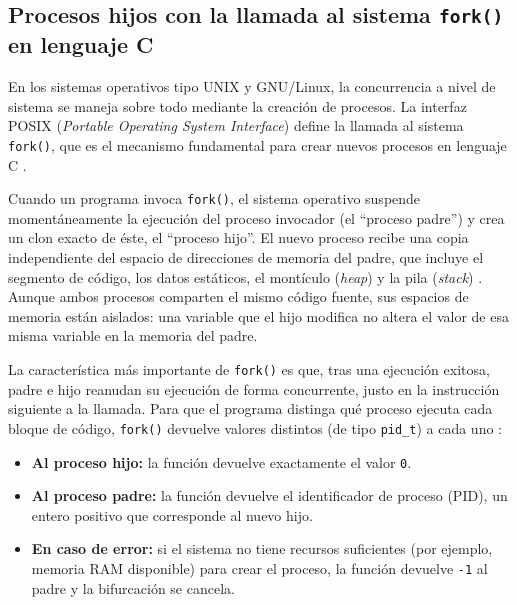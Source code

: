 \subsection{Procesos hijos con la llamada al sistema \texttt{fork()} en lenguaje C}
\label{sec:cap03:fork}

En los sistemas operativos tipo UNIX y GNU/Linux, la concurrencia a nivel de sistema se maneja sobre todo mediante la creación de procesos. La interfaz POSIX (\textit{Portable Operating System Interface}) define la llamada al sistema \texttt{fork()}, que es el mecanismo fundamental para crear nuevos procesos en lenguaje C \cite{silberschatz:os-concepts:2018}.

Cuando un programa invoca \texttt{fork()}, el sistema operativo suspende momentáneamente la ejecución del proceso invocador (el ``proceso padre'') y crea un clon exacto de éste, el ``proceso hijo''. El nuevo proceso recibe una copia independiente del espacio de direcciones de memoria del padre, que incluye el segmento de código, los datos estáticos, el montículo (\textit{heap}) y la pila (\textit{stack}) \cite{kerrisk:linux-programming-interface:2010}. Aunque ambos procesos comparten el mismo código fuente, sus espacios de memoria están aislados: una variable que el hijo modifica no altera el valor de esa misma variable en la memoria del padre.

La característica más importante de \texttt{fork()} es que, tras una ejecución exitosa, padre e hijo reanudan su ejecución de forma concurrente, justo en la instrucción siguiente a la llamada. Para que el programa distinga qué proceso ejecuta cada bloque de código, \texttt{fork()} devuelve valores distintos (de tipo \texttt{pid\_t}) a cada uno \cite{stevens:advanced-unix-programming:2013}:

\begin{itemize}
    \item \textbf{Al proceso hijo:} la función devuelve exactamente el valor \texttt{0}.
    \item \textbf{Al proceso padre:} la función devuelve el identificador de proceso (PID), un entero positivo que corresponde al nuevo hijo.
    \item \textbf{En caso de error:} si el sistema no tiene recursos suficientes (por ejemplo, memoria RAM disponible) para crear el proceso, la función devuelve \texttt{-1} al padre y la bifurcación se cancela.
\end{itemize}

